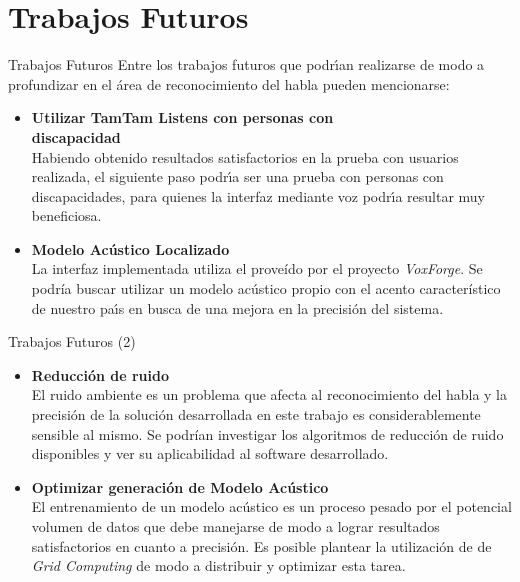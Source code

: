 \section{Trabajos Futuros}

\begin{frame}{Trabajos Futuros}
Entre los trabajos futuros que podr{\'\i}an realizarse de modo a profundizar en el \'area de reconocimiento del habla
pueden mencionarse:

\begin{itemize}
\item{\textbf{Utilizar TamTam Listens con personas con \\discapacidad\\}}
Habiendo obtenido resultados satisfactorios en la prueba con usuarios realizada, el siguiente paso podr{\'\i}a ser
una prueba con personas con discapacidades, para quienes la interfaz mediante voz podr{\'\i}a resultar
muy beneficiosa. 

\item{\textbf{Modelo Ac\'ustico Localizado\\}} 
La interfaz implementada utiliza el prove\'ido por el proyecto \emph{VoxForge}. 
Se podr\'ia buscar utilizar un modelo ac\'ustico propio con el acento caracter\'istico de nuestro pa{\'\i}s
en busca de una mejora en la precisi\'on del sistema.
\end{itemize}
\end{frame}

\begin{frame}{Trabajos Futuros (2)}
\begin{itemize}
\item{\textbf{Reducci\'on de ruido\\}}
El ruido ambiente es un problema que afecta al reconocimiento del habla y la precisi\'on de la soluci\'on 
desarrollada en este trabajo es considerablemente sensible al mismo. Se podr\'ian investigar los algoritmos
de reducci\'on de ruido disponibles y ver su aplicabilidad al software desarrollado.

\item{\textbf{Optimizar generaci\'on de Modelo Ac\'ustico\\}}
El entrenamiento de un modelo ac\'ustico es un proceso pesado por el potencial volumen de datos que debe
manejarse de modo a lograr resultados satisfactorios en cuanto a precisi\'on.
Es posible plantear la utilizaci\'on de de \emph{Grid Computing} de modo a distribuir y optimizar esta tarea.

\end{itemize}
\end{frame}

